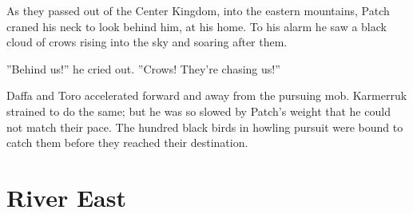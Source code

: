 \documentclass[12pt]{book}
\begin{document}
As they passed out of the Center Kingdom, into the eastern mountains, Patch craned his neck to look behind him, at his home. To his alarm he saw a black cloud of crows rising into the sky and soaring after them.\par
''Behind us!'' he cried out. ''Crows! They're chasing us!''\par
Daffa and Toro accelerated forward and away from the pursuing mob. Karmerruk strained to do the same; but he was so slowed by Patch's weight that he could not match their pace. The hundred black birds in howling pursuit were bound to catch them before they reached their destination.\par

\section{River East}
\end{document}
